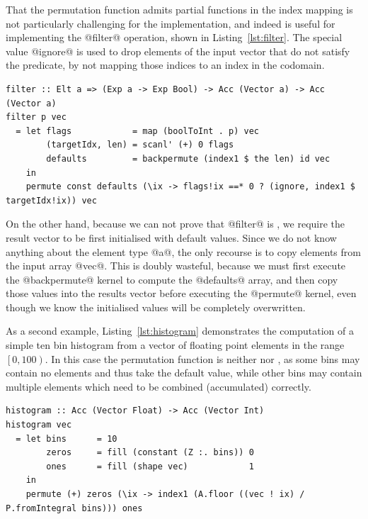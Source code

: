 That the permutation function admits partial functions in the index mapping is
not particularly challenging for the implementation, and indeed is useful for
implementing the @filter@ operation, shown in Listing~\ref{lst:filter}. The
special value @ignore@ is used to drop elements of the input vector that do not
satisfy the predicate, by not mapping those indices to an index in the codomain.
%
\begin{lstlisting}[style=haskell_float
    ,label=lst:filter
    ,caption={[Filtering a vector based on a predicate] Filtering returns only
    those elements of a vector which satisfy a predicate. This operation is
    included as part of Accelerate's standard prelude.}]
filter :: Elt a => (Exp a -> Exp Bool) -> Acc (Vector a) -> Acc (Vector a)
filter p vec
  = let flags            = map (boolToInt . p) vec
        (targetIdx, len) = scanl' (+) 0 flags
        defaults         = backpermute (index1 $ the len) id vec
    in
    permute const defaults (\ix -> flags!ix ==* 0 ? (ignore, index1 $ targetIdx!ix)) vec
\end{lstlisting}

On the other hand, because we can not prove that @filter@ is
, we require the result vector to be first initialised with
default values. Since we do not know anything about the element type @a@, the
only recourse is to copy elements from the input array @vec@. This is doubly
wasteful, because we must first execute the @backpermute@ kernel to compute the
@defaults@ array, and then copy those values into the results vector before
executing the @permute@ kernel, even though we know the initialised values
will be completely overwritten.

As a second example, Listing~\ref{lst:histogram} demonstrates the computation of
a simple ten bin histogram from a vector of floating point elements in the range
$\left[ 0, 100 \right)$. In this case the permutation function is neither
 nor , as some bins may contain no elements
and thus take the default value, while other bins may contain multiple elements
which need to be combined (accumulated) correctly.
%
\begin{lstlisting}[style=haskell_float
    ,label=lst:histogram
    ,caption={[A simple histogram] A simple histogram written in
    Accelerate. We assume the input vector contains elements in the range
    $\left[0,100\right)$ and accumulate into ten equally sized bins.}]
histogram :: Acc (Vector Float) -> Acc (Vector Int)
histogram vec
  = let bins      = 10
        zeros     = fill (constant (Z :. bins)) 0
        ones      = fill (shape vec)            1
    in
    permute (+) zeros (\ix -> index1 (A.floor ((vec ! ix) / P.fromIntegral bins))) ones
\end{lstlisting}

